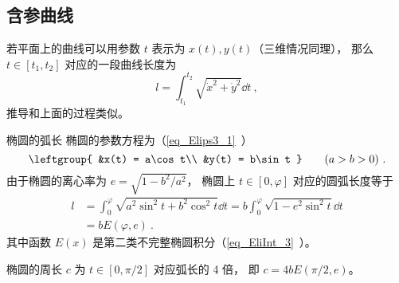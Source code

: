 \subsection{含参曲线}
若平面上的曲线可以用参数 $t$ 表示为 $x(t), y(t)$（三维情况同理）， 那么 $t \in [t_1, t_2]$ 对应的一段曲线长度为
\begin{equation}\label{eq_CurLen_2}
l = \int_{t_1}^{t_2} \sqrt{\dot x^2 + \dot y^2} \dd{t}~,
\end{equation}
推导和上面的过程类似。

\begin{example}{椭圆的弧长}\label{ex_CurLen_1}
椭圆的参数方程为（\autoref{eq_Elips3_1}~）
\begin{equation}
\leftgroup{
&x(t) = a\cos t\\
&y(t) = b\sin t
} \qquad
(a > b > 0)~.
\end{equation}
由于椭圆的离心率为 $e = \sqrt{1 - b^2/a^2}$， 椭圆上 $t \in [0, \varphi]$ 对应的圆弧长度等于
\begin{equation}
\begin{aligned}
l &= \int_0^{\varphi} \sqrt{a^2\sin^2 t + b^2 \cos^2 t} \dd{t}
= b\int_0^\varphi \sqrt{1 - e^2\sin^2 t} \dd{t}\\
&= b E(\varphi, e)~.
\end{aligned}
\end{equation}
其中函数 $E(x)$ 是第二类不完整椭圆积分（\autoref{eq_EliInt_3}~）。

椭圆的周长 $c$ 为 $t \in [0, \pi/2]$ 对应弧长的 4 倍， 即 $c = 4bE(\pi/2, e)$。
\end{example}
